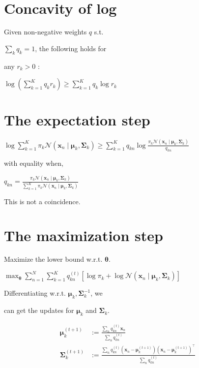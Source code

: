 \documentclass[10pt]{article}
\begin{document}
\section*{Concavity of log}
Given non-negative weights $q$ s.t.

$\sum_{k} q_{k}=1$, the following holds for

any $r_{k}>0$ :

$\log \left(\sum_{k=1}^{K} q_{k} r_{k}\right) \geq \sum_{k=1}^{K} q_{k} \log r_{k}$

\section*{The expectation step}
$\log \sum_{k=1}^{K} \pi_{k} \mathcal{N}\left(\mathbf{x}_{n} \mid \boldsymbol{\mu}_{k}, \boldsymbol{\Sigma}_{k}\right) \geq \sum_{k=1}^{K} q_{k n} \log \frac{\pi_{k} \mathcal{N}\left(\mathbf{x}_{n} \mid \boldsymbol{\mu}_{k}, \boldsymbol{\Sigma}_{k}\right)}{q_{k n}}$

with equality when,

$q_{k n}=\frac{\pi_{k} \mathcal{N}\left(\mathbf{x}_{n} \mid \boldsymbol{\mu}_{k}, \boldsymbol{\Sigma}_{k}\right)}{\sum_{k=1}^{K} \pi_{k} \mathcal{N}\left(\mathbf{x}_{n} \mid \boldsymbol{\mu}_{k}, \boldsymbol{\Sigma}_{k}\right)}$

This is not a coincidence.

\section*{The maximization step}
Maximize the lower bound w.r.t. $\boldsymbol{\theta}$.

$\max _{\boldsymbol{\theta}} \sum_{n=1}^{N} \sum_{k=1}^{K} q_{k n}^{(t)}\left[\log \pi_{k}+\log \mathcal{N}\left(\mathbf{x}_{n} \mid \boldsymbol{\mu}_{k}, \boldsymbol{\Sigma}_{k}\right)\right]$

Differentiating w.r.t. $\boldsymbol{\mu}_{k}, \boldsymbol{\Sigma}_{k}^{-1}$, we

can get the updates for $\boldsymbol{\mu}_{k}$ and $\boldsymbol{\Sigma}_{k}$.

$$
\begin{aligned}
\boldsymbol{\mu}_{k}^{(t+1)} & :=\frac{\sum_{n} q_{k n}^{(t)} \mathbf{x}_{n}}{\sum_{n} q_{k n}^{(t)}} \\
\boldsymbol{\Sigma}_{k}^{(t+1)} & :=\frac{\sum_{n} q_{k n}^{(t)}\left(\mathbf{x}_{n}-\boldsymbol{\mu}_{k}^{(t+1)}\right)\left(\mathbf{x}_{n}-\boldsymbol{\mu}_{k}^{(t+1)}\right)^{\top}}{\sum_{n} q_{k n}^{(t)}}
\end{aligned}
$$
\end{document}
